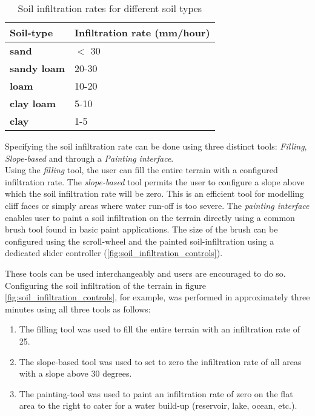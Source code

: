 \begin{table}[h]
  \centering
	    \begin{tabular}{|p{5cm}|p{8cm}|}
  	    \hline	
  	    \textbf{Soil-type} & \textbf{Infiltration rate (mm/hour)} \\
		\hline
		\textbf{sand} & $<$ 30 \\
		\hline
		\textbf{sandy loam} & 20-30 \\
		\hline
		\textbf{loam} & 10-20 \\
		\hline
		\textbf{clay loam} & 5-10 \\
		\hline
		\textbf{clay} & 1-5 \\
		\hline
		\end{tabular}
		\caption{Soil infiltration rates for different soil types \protect\footnotemark}
	  \label{tab:soil_types}
\end{table}


Specifying the soil infiltration rate can be done using three distinct tools: \textit{Filling}, \textit{Slope-based} and through a \textit{Painting interface}.\\
Using the \textit{filling} tool, the user can fill the entire terrain with a configured infiltration rate.
The \textit{slope-based} tool permits the user to configure a slope above which the soil infiltration rate will be zero. This is an efficient tool for modelling cliff faces or simply areas where water run-off is too severe. The \textit{painting interface} enables user to paint a soil infiltration on the terrain directly using a common brush tool found in basic paint applications. The size of the brush can be configured using the scroll-wheel and the painted soil-infiltration using a dedicated slider controller (\ref{fig:soil_infiltration_controls}).

These tools can be used interchangeably and users are encouraged to do so. Configuring the soil infiltration of the terrain in figure \ref{fig:soil_infiltration_controls}, for example, was performed in approximately three minutes using all three tools as follows:
\begin{enumerate}
\item The filling tool was used to fill the entire terrain with an infiltration rate of 25.\\
\item The slope-based tool was used to set to zero the infiltration rate of all areas with a slope above 30 degrees.\\
\item The painting-tool was used to paint an infiltration rate of zero on the flat area to the right to cater for a water build-up (reservoir, lake, ocean, etc.).\\
\end{enumerate}

